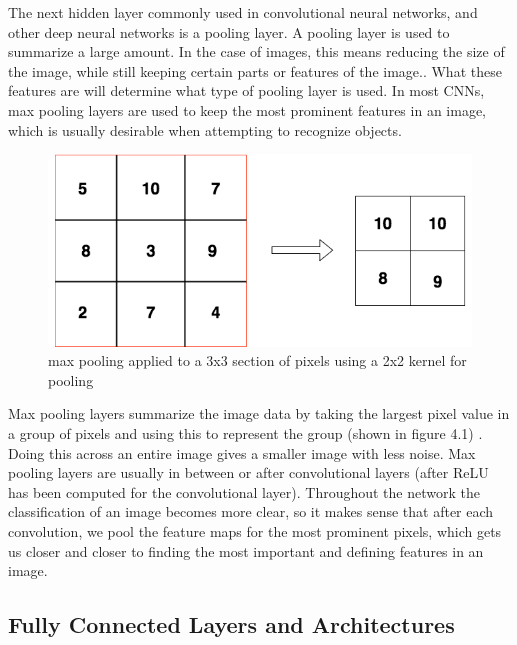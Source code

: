 \documentclass[12pt]{report} %
\begin{document}
	The next hidden layer commonly used in convolutional neural networks, and other deep neural networks is a pooling layer. A pooling layer is used to summarize a large amount. In the case of images, this means reducing the size of the image, while still keeping certain parts or features of the image.\cite{aurelienMachineLearning}. What these features are will determine what type of pooling layer is used. In most CNNs, max pooling layers are used to keep the most prominent features in an image, which is usually desirable when attempting to recognize objects. 
\begin{figure}
\centering
\includegraphics[width=7in]{max_pooling}
\caption{max pooling applied to a 3x3 section of pixels using a 2x2 kernel for pooling}
\end{figure}		
	Max pooling layers summarize the image data by taking the largest pixel value in a group of pixels and using this to represent the group (shown in figure 4.1) . Doing this across an entire image gives a smaller image with less noise. Max pooling layers are usually in between or after convolutional layers (after ReLU has been computed for the convolutional layer). Throughout the network the classification of an image becomes more clear, so it makes sense that after each convolution, we pool the feature maps for the most prominent pixels, which gets us closer and closer to finding the most important and defining features in an image. 

 \subsection{Fully Connected Layers and Architectures}
	
\end{document}
